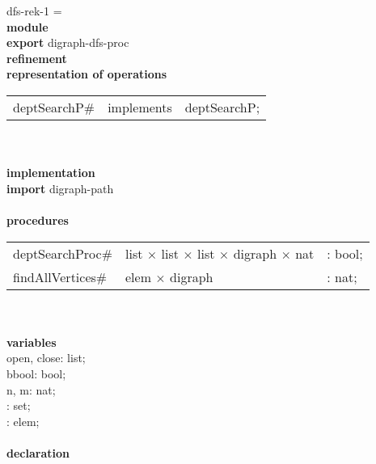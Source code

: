 \begin{tabbing}
dfs-rek-1 = \\
{\bf mod}\={\bf ule}\+\\
{\bf export} digraph-dfs-proc\\
{\bf ref}\={\bf inement}\+\\
{\bf rep}\= {\bf resentation of operations}\+\\
\begin{tabular}{lcl}
deptSearchP\# & implements & deptSearchP;
\end{tabular}\-\\

\\
{\bf implementation}\\
{\bf import} digraph-path\\
\\
{\bf proc}\={\bf edures}\+\\
\begin{tabular}{lll}
deptSearchProc\#& list $\times$ list $\times$ list $\times$ digraph $\times$ nat & : bool;\\
findAllVertices\#& elem $\times$ digraph & : nat;
\end{tabular}\-\\
\\
{\bf vari}\={\bf ables}\+\\
open, close: list;\\
bbool: bool;\\
n, m: nat;\\
: set;\\
: elem;
\-\\
\\

               {\bf declaration}
\end{tabbing}

